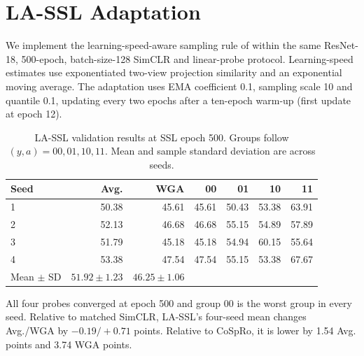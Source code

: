 \documentclass{article}
\begin{document}
\section{LA-SSL Adaptation}\label{app:lassl}
We implement the learning-speed-aware sampling rule of \citet{zhu2023lassl} within the same ResNet-18, 500-epoch, batch-size-128 SimCLR and linear-probe protocol. Learning-speed estimates use exponentiated two-view projection similarity and an exponential moving average. The adaptation uses EMA coefficient 0.1, sampling scale 10 and quantile 0.1, updating every two epochs after a ten-epoch warm-up (first update at epoch 12).

\begin{table}[H]
\centering\small
\caption{LA-SSL validation results at SSL epoch 500. Groups follow $(y,a) = 00, 01, 10, 11$. Mean and sample standard deviation are across seeds.}
\begin{tabular}{lrrrrrr}
\toprule
Seed & Avg. & WGA & 00 & 01 & 10 & 11 \\
\midrule
1 & 50.38 & 45.61 & 45.61 & 50.43 & 53.38 & 63.91 \\
2 & 52.13 & 46.68 & 46.68 & 55.15 & 54.89 & 57.89 \\
3 & 51.79 & 45.18 & 45.18 & 54.94 & 60.15 & 55.64 \\
4 & 53.38 & 47.54 & 47.54 & 55.15 & 53.38 & 67.67 \\
\midrule
Mean $\pm$ SD & $51.92\pm1.23$ & $46.25\pm1.06$ & & & & \\
\bottomrule
\end{tabular}
\label{tab:lassl}
\end{table}

All four probes converged at epoch 500 and group 00 is the worst group in every seed. Relative to matched SimCLR, LA-SSL's four-seed mean changes Avg./WGA by $-0.19/+0.71$ points. Relative to CoSpRo, it is lower by 1.54 Avg. points and 3.74 WGA points.
\end{document}
